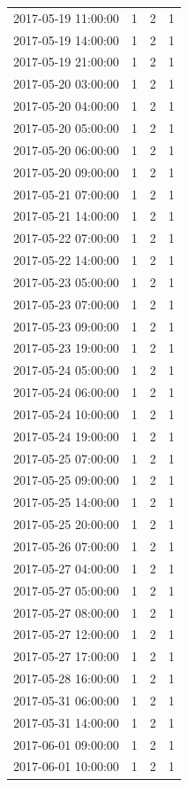 \begin{tabular}{lrrr}
2017-05-19 11:00:00 & 1 & 2 & 1 \\
2017-05-19 14:00:00 & 1 & 2 & 1 \\
2017-05-19 21:00:00 & 1 & 2 & 1 \\
2017-05-20 03:00:00 & 1 & 2 & 1 \\
2017-05-20 04:00:00 & 1 & 2 & 1 \\
2017-05-20 05:00:00 & 1 & 2 & 1 \\
2017-05-20 06:00:00 & 1 & 2 & 1 \\
2017-05-20 09:00:00 & 1 & 2 & 1 \\
2017-05-21 07:00:00 & 1 & 2 & 1 \\
2017-05-21 14:00:00 & 1 & 2 & 1 \\
2017-05-22 07:00:00 & 1 & 2 & 1 \\
2017-05-22 14:00:00 & 1 & 2 & 1 \\
2017-05-23 05:00:00 & 1 & 2 & 1 \\
2017-05-23 07:00:00 & 1 & 2 & 1 \\
2017-05-23 09:00:00 & 1 & 2 & 1 \\
2017-05-23 19:00:00 & 1 & 2 & 1 \\
2017-05-24 05:00:00 & 1 & 2 & 1 \\
2017-05-24 06:00:00 & 1 & 2 & 1 \\
2017-05-24 10:00:00 & 1 & 2 & 1 \\
2017-05-24 19:00:00 & 1 & 2 & 1 \\
2017-05-25 07:00:00 & 1 & 2 & 1 \\
2017-05-25 09:00:00 & 1 & 2 & 1 \\
2017-05-25 14:00:00 & 1 & 2 & 1 \\
2017-05-25 20:00:00 & 1 & 2 & 1 \\
2017-05-26 07:00:00 & 1 & 2 & 1 \\
2017-05-27 04:00:00 & 1 & 2 & 1 \\
2017-05-27 05:00:00 & 1 & 2 & 1 \\
2017-05-27 08:00:00 & 1 & 2 & 1 \\
2017-05-27 12:00:00 & 1 & 2 & 1 \\
2017-05-27 17:00:00 & 1 & 2 & 1 \\
2017-05-28 16:00:00 & 1 & 2 & 1 \\
2017-05-31 06:00:00 & 1 & 2 & 1 \\
2017-05-31 14:00:00 & 1 & 2 & 1 \\
2017-06-01 09:00:00 & 1 & 2 & 1 \\
2017-06-01 10:00:00 & 1 & 2 & 1 \\

\end{tabular}
